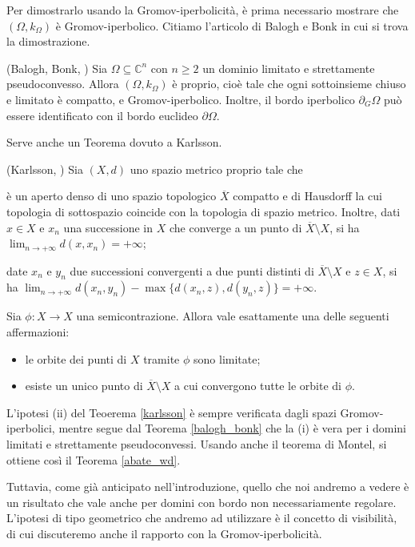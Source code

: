 Per dimostrarlo usando la Gromov-iperbolicità, è prima necessario mostrare che $(\Omega,k_{\Omega})$ è Gromov-iperbolico. Citiamo l'articolo di Balogh e Bonk in cui si trova la dimostrazione.

\begin{thm} \label{balogh_bonk}
    (Balogh, Bonk, \cite[Theorem 1.4]{BB}) Sia $\Omega \subseteq \mathbb{C}^n$ con $n \ge 2$ un dominio limitato e strettamente pseudoconvesso. Allora $(\Omega,k_{\Omega})$ è proprio, cioè tale che ogni sottoinsieme chiuso e limitato è compatto, e Gromov-iperbolico. Inoltre, il bordo iperbolico $\partial_G\Omega$ può essere identificato con il bordo euclideo $\partial\Omega$.
\end{thm}

Serve anche un Teorema dovuto a Karlsson.

\begin{thm} \label{karlsson}
    (Karlsson, \cite[Corollary 3.7]{Ka}) Sia $(X,d)$ uno spazio metrico proprio tale che
    \begin{nlist}
        \item è un aperto denso di uno spazio topologico $\overline{X}$ compatto e di Hausdorff la cui topologia di sottospazio coincide con la topologia di spazio metrico. Inoltre, dati $x \in X$ e $x_n$ una successione in $X$ che converge a un punto di $\overline{X}\setminus X$, si ha $\displaystyle\lim_{n\longrightarrow+\infty}d(x,x_n)=+\infty$;
        \item date $x_n$ e $y_n$ due successioni convergenti a due punti distinti di $\overline{X}\setminus X$ e $z \in X$, si ha $\displaystyle\lim_{n\longrightarrow+\infty} d(x_n,y_n)-\max\{d(x_n,z),d(y_n,z)\}=+\infty$.
    \end{nlist}
    Sia $\phi:X \longrightarrow X$ una semicontrazione. Allora vale esattamente una delle seguenti affermazioni:
    \begin{itemize}
        \item le orbite dei punti di $X$ tramite $\phi$ sono limitate;
        \item esiste un unico punto di $\overline{X}\setminus X$ a cui convergono tutte le orbite di $\phi$.
    \end{itemize}
\end{thm}

L'ipotesi (ii) del Teoerema \ref{karlsson} è sempre verificata dagli spazi Gromov-iperbolici, mentre segue dal Teorema \ref{balogh_bonk} che la (i) è vera per i domini limitati e strettamente pseudoconvessi. Usando anche il teorema di Montel, si ottiene così il Teorema \ref{abate_wd}.

Tuttavia, come già anticipato nell'introduzione, quello che noi andremo a vedere è un risultato che vale anche per domini con bordo non necessariamente regolare. L'ipotesi di tipo geometrico che andremo ad utilizzare è il concetto di visibilità, di cui discuteremo anche il rapporto con la Gromov-iperbolicità.